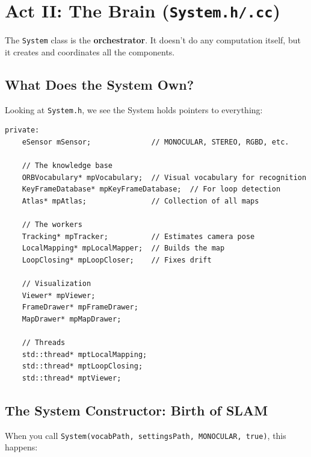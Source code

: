 \section{Act II: The Brain (\texttt{System.h/.cc})}

The \texttt{System} class is the \textbf{orchestrator}. It doesn't do any computation itself, but it creates and coordinates all the components.

\subsection{What Does the System Own?}

Looking at \texttt{System.h}, we see the System holds pointers to everything:

\begin{lstlisting}[caption={System's private members (simplified)}]
private:
    eSensor mSensor;              // MONOCULAR, STEREO, RGBD, etc.
    
    // The knowledge base
    ORBVocabulary* mpVocabulary;  // Visual vocabulary for recognition
    KeyFrameDatabase* mpKeyFrameDatabase;  // For loop detection
    Atlas* mpAtlas;               // Collection of all maps
    
    // The workers
    Tracking* mpTracker;          // Estimates camera pose
    LocalMapping* mpLocalMapper;  // Builds the map
    LoopClosing* mpLoopCloser;    // Fixes drift
    
    // Visualization
    Viewer* mpViewer;
    FrameDrawer* mpFrameDrawer;
    MapDrawer* mpMapDrawer;
    
    // Threads
    std::thread* mptLocalMapping;
    std::thread* mptLoopClosing;
    std::thread* mptViewer;
\end{lstlisting}

\subsection{The System Constructor: Birth of SLAM}

When you call \texttt{System(vocabPath, settingsPath, MONOCULAR, true)}, this happens:

